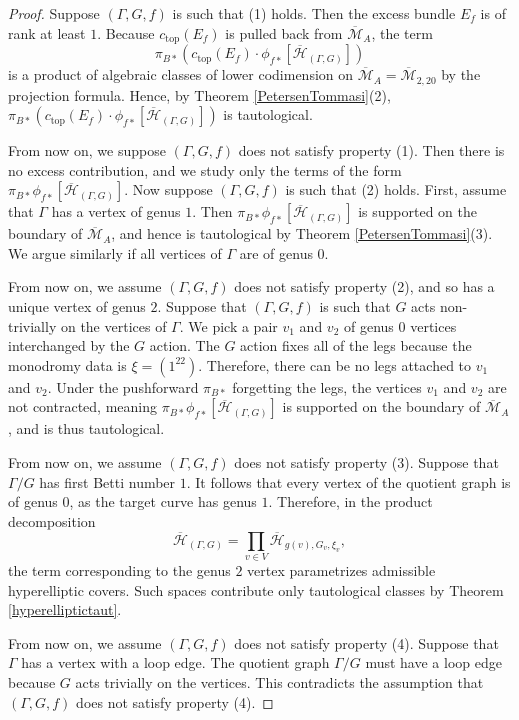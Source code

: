 \documentclass[12pt]{amsart}
\theoremstyle{definition}
\newcommand{\Hb}{\overline{\mathcal{H}}}
\newcommand{\M}{\mathcal{M}}
\newcommand{\Mb}{\overline{\M}}
\begin{document}
\begin{proof}
    Suppose $(\Gamma,G,f)$ is such that (1) holds. Then the excess bundle $E_f$ is of rank at least $1$. Because $c_{\mathrm{top}}(E_f)$ is pulled back from $\Mb_{A}$, the term
    \[
    \pi_{B*}\left(c_{\mathrm{top}}(E_f)\cdot \phi_{f*}[\Hb_{(\Gamma,G)}]\right)
    \]
    is a product of algebraic classes of lower codimension on $\Mb_{A}=\Mb_{2,20}$ by the projection formula. Hence, by Theorem \ref{PetersenTommasi}(2), $\pi_{B*}\left(c_{\mathrm{top}}(E_f)\cdot \phi_{f*}[\Hb_{(\Gamma,G)}]\right)$ is tautological. 
    
    From now on, we suppose $(\Gamma,G,f)$ does not satisfy property (1). Then there is no excess contribution, and we study only the terms of the form $\pi_{B*}\phi_{f*}[\Hb_{(\Gamma,G)}]$. Now suppose $(\Gamma,G,f)$ is such that (2) holds. First, assume that $\Gamma$ has a vertex of genus $1$. Then $\pi_{B*}\phi_{f*}[\Hb_{(\Gamma,G)}]$ is supported on the boundary of $\Mb_{A}$, and hence is tautological by Theorem \ref{PetersenTommasi}(3). We argue similarly if all vertices of $\Gamma$ are of genus $0$.

    From now on, we assume $(\Gamma,G,f)$ does not satisfy property (2), and so has a unique vertex of genus $2$. Suppose that $(\Gamma,G,f)$ is such that $G$ acts non-trivially on the vertices of $\Gamma$. We pick a pair $v_1$ and $v_2$ of genus $0$ vertices interchanged by the $G$ action. The $G$ action fixes all of the legs because the monodromy data is $\xi=(1^{22})$. Therefore, there can be no legs attached to $v_1$ and $v_2$. Under the pushforward $\pi_{B*}$ forgetting the legs, the vertices $v_1$ and $v_2$ are not contracted, meaning $\pi_{B*}\phi_{f*}[\Hb_{(\Gamma,G)}]$ is supported on the boundary of $\Mb_{A}$, and is thus tautological.

    From now on, we assume $(\Gamma,G,f)$ does not satisfy property (3). Suppose that $\Gamma/G$ has first Betti number $1$. It follows that every vertex of the quotient graph is of genus $0$, as the target curve has genus $1$. Therefore, in the product decomposition 
    \[
    \Hb_{(\Gamma,G)}=\prod_{v\in V} \Hb_{g(v),G_v,\xi_v},
    \]
    the term corresponding to the genus $2$ vertex parametrizes admissible hyperelliptic covers. Such spaces contribute only tautological classes by Theorem \ref{hyperelliptictaut}. 
    
    From now on, we assume $(\Gamma,G,f)$ does not satisfy property (4). Suppose that $\Gamma$ has a vertex with a loop edge. The quotient graph $\Gamma/G$ must have a loop edge because $G$ acts trivially on the vertices. This contradicts the assumption that $(\Gamma,G,f)$ does not satisfy property (4). 


\end{proof}
\end{document}
